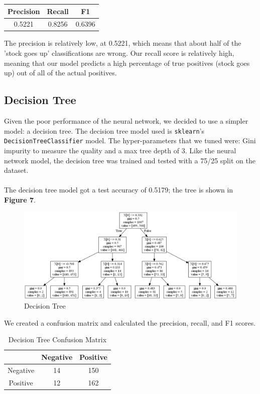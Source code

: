 \documentclass[12pt, notitlepage]{article}
\begin{document}
\begin{table}[H]
	\centering
	\begin{tabular}{|c|c|c|}
		\hline
		Precision & Recall & F1 \\
		\hline
		0.5221 & 0.8256 & 0.6396 \\
		\hline
	\end{tabular}
\end{table}
The precision is relatively low, at 0.5221, which means that about half of the 'stock goes up' classifications are wrong. Our recall score is relatively high, meaning that our model predicts a high percentage of true positives (stock goes up) out of all of the actual positives. 
\subsection{Decision Tree}
Given the poor performance of the neural network, we decided to use a simpler model: a decision tree. The decision tree model used is \texttt{sklearn}'s \texttt{DecisionTreeClassifier} model. The hyper-parameters that we tuned were: Gini impurity to measure the quality and a max tree depth of 3. Like the neural network model, the decision tree was trained and tested with a 75/25 split on the dataset. \\\\
The decision tree model got a test accuracy of 0.5179; the tree is shown in \textbf{Figure 7}.
\begin{figure}[H]
	\centering
	\includegraphics[scale=0.45]{images/tree.png}
	\caption{Decision Tree}
	\label{fig:DT}
\end{figure}
We created a confusion matrix and calculated the precision, recall, and F1 scores.
\begin{table}[H]
	\caption{Decision Tree Confusion Matrix}
	\centering
	\begin{tabular}{|c|c|c|}
		\hline
		\diagbox[width=11em]{Actual}{Predicted} & Negative & Positive \\
		\hline
		Negative & 14 & 150 \\
		\hline
		Positive & 12 & 162 \\
		\hline
	\end{tabular}
\end{table}
\end{document}
